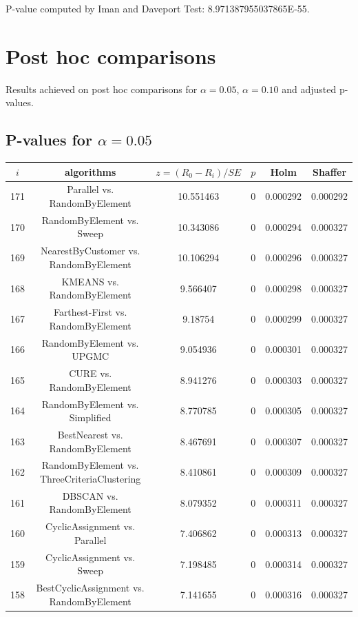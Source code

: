 \documentclass[a4paper,10pt]{article}
\begin{document}
\begin{landscape}
P-value computed by Iman and Daveport Test: 8.971387955037865E-55.\newline



\pagebreak

\section{Post hoc comparisons}

Results achieved on post hoc comparisons for $\alpha = 0.05$, $\alpha = 0.10$ and adjusted p-values.

\subsection{P-values for $\alpha=0.05$}

\begin{table}[!htp]
\centering\scriptsize
\begin{tabular}{cccccc}
$i$&algorithms&$z=(R_0 - R_i)/SE$&$p$&Holm&Shaffer\\
\hline171&Parallel vs. RandomByElement&10.551463&0&0.000292&0.000292\\
170&RandomByElement vs. Sweep&10.343086&0&0.000294&0.000327\\
169&NearestByCustomer vs. RandomByElement&10.106294&0&0.000296&0.000327\\
168&KMEANS vs. RandomByElement&9.566407&0&0.000298&0.000327\\
167&Farthest-First vs. RandomByElement&9.18754&0&0.000299&0.000327\\
166&RandomByElement vs. UPGMC&9.054936&0&0.000301&0.000327\\
165&CURE vs. RandomByElement&8.941276&0&0.000303&0.000327\\
164&RandomByElement vs. Simplified&8.770785&0&0.000305&0.000327\\
163&BestNearest vs. RandomByElement&8.467691&0&0.000307&0.000327\\
162&RandomByElement vs. ThreeCriteriaClustering&8.410861&0&0.000309&0.000327\\
161&DBSCAN vs. RandomByElement&8.079352&0&0.000311&0.000327\\
160&CyclicAssignment vs. Parallel&7.406862&0&0.000313&0.000327\\
159&CyclicAssignment vs. Sweep&7.198485&0&0.000314&0.000327\\
158&BestCyclicAssignment vs. RandomByElement&7.141655&0&0.000316&0.000327\\

\end{tabular}
\end{table}
\end{landscape}
\end{document}
